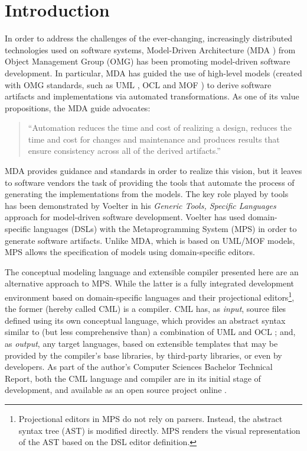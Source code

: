 \section{Introduction}
%
In order to address the challenges of the ever-changing,
increasingly distributed technologies used on software systems,
Model-Driven Architecture (MDA \cite{mda}) from Object Management Group (OMG)
has been promoting model-driven software development.
In particular, MDA has guided the use of high-level models
(created with OMG standards, such as UML \cite{uml}, OCL \cite{ocl} and MOF \cite{mof})
to derive software artifacts and implementations via automated transformations.
As one of its value propositions, the MDA guide \cite{mda} advocates:

\begin{quote}``Automation reduces the time and cost of realizing a design,
reduces the time and cost for changes and maintenance and produces results that ensure consistency across all of the derived artifacts.''\end{quote}

MDA provides guidance and standards in order to realize this vision,
but it leaves to software vendors the task of providing the tools
that automate the process of generating the implementations from the models.
The key role played by tools has been demonstrated by Voelter \cite{voelter}
in his \emph{Generic Tools, Specific Languages} approach for model-driven software development.
Voelter \cite{voelter} has used domain-specific languages (DSLs) with the Metaprogramming System (MPS)
in order to generate software artifacts.
Unlike MDA, which is based on UML/MOF models,
MPS allows the specification of models using domain-specific editors.

The conceptual modeling language and extensible compiler presented here are an alternative approach to MPS.
While the latter is a fully integrated development environment
based on domain-specific languages and their projectional editors\footnote{Projectional
editors in MPS do not rely on parsers.
Instead, the abstract syntax tree (AST) is modified directly.
MPS renders the visual representation of the AST based on the DSL editor definition.},
the former (hereby called CML) is a compiler.
CML has, as \emph{input}, source files defined using its own conceptual language,
which provides an abstract syntax similar to (but less comprehensive than)
a combination of UML \cite{uml} and OCL \cite{ocl};
and, as \emph{output}, any target languages,
based on extensible templates that may be provided by the compiler's base libraries,
by third-party libraries, or even by developers.
As part of the author's Computer Sciences Bachelor Technical Report,
both the CML language and compiler are in its initial stage of development,
and available as an open source project online \cite{cml-repo}.

